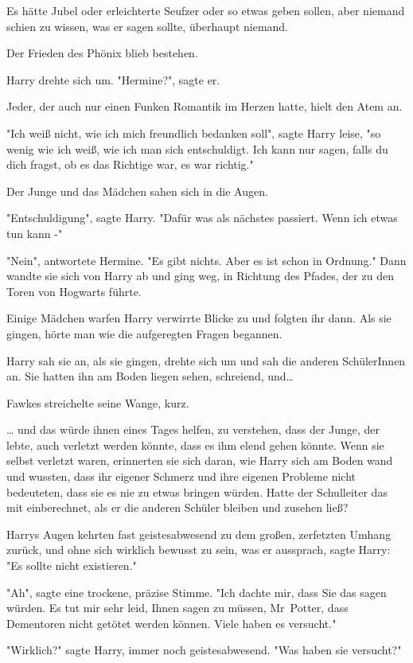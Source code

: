 {Es hätte Jubel oder erleichterte Seufzer oder so etwas geben sollen, aber niemand schien zu wissen, was er sagen sollte, überhaupt niemand.

Der Frieden des Phönix blieb bestehen.

Harry drehte sich um. "Hermine?", sagte er.

Jeder, der auch nur einen Funken Romantik im Herzen hatte, hielt den Atem an.

"Ich weiß nicht, wie ich mich freundlich bedanken soll", sagte Harry leise, "so wenig wie ich weiß, wie ich man sich entschuldigt. Ich kann nur sagen, falls du dich fragst, ob es das Richtige war, es war richtig."

Der Junge und das Mädchen sahen sich in die Augen.

"Entschuldigung", sagte Harry. "Dafür was als nächstes passiert. Wenn ich etwas tun kann -"

"Nein", antwortete Hermine. "Es gibt nichts. Aber es ist schon in Ordnung." Dann wandte sie sich von Harry ab und ging weg, in Richtung des Pfades, der zu den Toren von Hogwarts führte.

Einige Mädchen warfen Harry verwirrte Blicke zu und folgten ihr dann. Als sie gingen, hörte man wie die aufgeregten Fragen begannen.

Harry sah sie an, als sie gingen, drehte sich um und sah die anderen SchülerInnen an. Sie hatten ihn am Boden liegen sehen, schreiend, und…

Fawkes streichelte seine Wange, kurz.

… und das würde ihnen eines Tages helfen, zu verstehen, dass der Junge, der lebte, auch verletzt werden könnte, dass es ihm elend gehen könnte. Wenn sie selbst verletzt waren, erinnerten sie sich daran, wie Harry sich am Boden wand und wussten, dass ihr eigener Schmerz und ihre eigenen Probleme nicht bedeuteten, dass sie es nie zu etwas bringen würden. Hatte der Schulleiter das mit einberechnet, als er die anderen Schüler bleiben und zusehen ließ?

Harrys Augen kehrten fast geistesabwesend zu dem großen, zerfetzten Umhang zurück, und ohne sich wirklich bewusst zu sein, was er aussprach, sagte Harry: "Es sollte nicht existieren."

"Ah", sagte eine trockene, präzise Stimme. "Ich dachte mir, dass Sie das sagen würden. Es tut mir sehr leid, Ihnen sagen zu müssen, Mr~Potter, dass Dementoren nicht getötet werden können. Viele haben es versucht."

"Wirklich?" sagte Harry, immer noch geistesabwesend. "Was haben sie versucht?"

}
